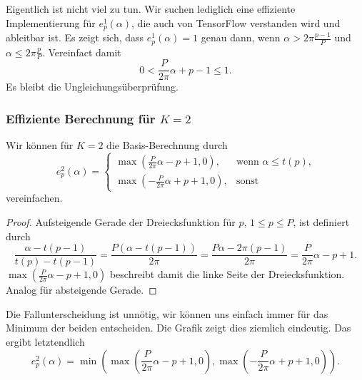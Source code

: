 Eigentlich ist nicht viel zu tun.
Wir suchen lediglich eine effiziente Implementierung für $e_p^1\left(\alpha\right)$, die auch von TensorFlow verstanden wird und ableitbar ist.
Es zeigt sich, dass $e_p^1\left(\alpha\right) = 1$ genau dann, wenn $\alpha > 2\pi\frac{p-1}{P}$ und $\alpha \leq 2\pi\frac{p}{P}$.
Vereinfact damit
\begin{equation}
  0 < \frac{P}{2\pi}\alpha + p - 1 \leq 1.
\end{equation}
Es bleibt die Ungleichungsüberprüfung.

\subsubsection{Effiziente Berechnung für $K=2$}

Wir können für $K=2$ die Basis-Berechnung durch
\begin{equation}
  e_p^2\left(\alpha\right) = \begin{cases}
    \max\left(\frac{P}{2\pi} \alpha - p + 1, 0\right), & \text{wenn }\alpha \leq t\left(p\right)\text{,}\\
    \max\left(-\frac{P}{2\pi} \alpha + p + 1, 0\right), & \text{sonst}
  \end{cases}
\end{equation}
vereinfachen.

\begin{proof}
  Aufsteigende Gerade der Dreiecksfunktion für $p$, $1 \leq p \leq P$, ist definiert durch
  \begin{equation}
    \frac{\alpha - t\left(p-1\right)}{t\left(p\right) - t\left(p-1\right)} = \frac{P\left(\alpha - t\left(p-1\right)\right)}{2\pi} = \frac{P\alpha - 2\pi\left(p-1\right)}{2\pi} = \frac{P}{2\pi}\alpha - p + 1.
  \end{equation}
  $\max \left(\frac{P}{2\pi} \alpha - p + 1, 0\right)$ beschreibt damit die linke Seite der Dreiecksfunktion.
  Analog für absteigende Gerade.
\end{proof}

Die Fallunterscheidung ist unnötig, wir können uns einfach immer für das Minimum der beiden entscheiden.
Die Grafik zeigt dies ziemlich eindeutig.
Das ergibt letztendlich
\begin{equation}
  e_p^2\left(\alpha\right) = \min \left( \max\left(\frac{P}{2\pi} \alpha - p + 1, 0\right), \max\left(-\frac{P}{2\pi} \alpha + p + 1, 0\right) \right)\text{.}
\end{equation}



